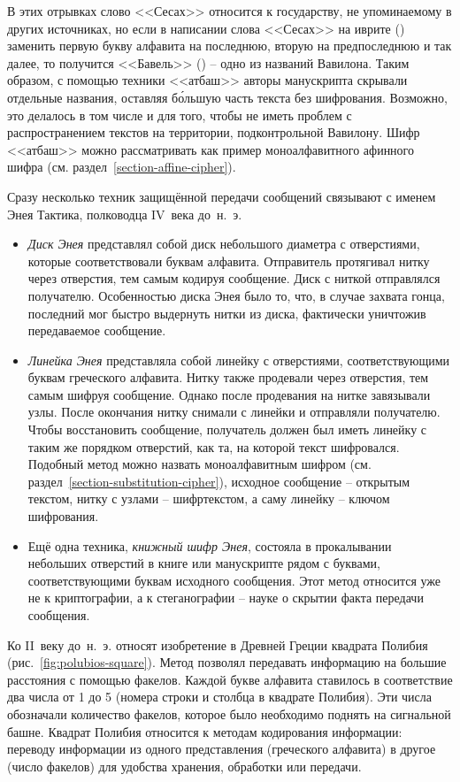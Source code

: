 В этих отрывках слово <<Сесах>> относится к государству, не упоминаемому в других источниках, но если в написании слова <<Сесах>> на иврите () заменить первую букву алфавита на последнюю, вторую на предпоследнюю и так далее, то получится <<Бавель>> () -- одно из названий Вавилона. Таким образом, с помощью техники <<атбаш>> авторы манускрипта скрывали отдельные названия, оставляя б\'{о}льшую часть текста без шифрования. Возможно, это делалось в том числе и для того, чтобы не иметь проблем с распространением текстов на территории, подконтрольной Вавилону. Шифр <<атбаш>> можно рассматривать как пример моноалфавитного афинного шифра (см. раздел~\ref{section-affine-cipher}).

Сразу несколько техник защищённой передачи сообщений связывают с именем Энея Тактика, полководца IV~века до~н.~э.
\begin{itemize}
	\item \emph{Диск Энея} представлял собой диск небольшого диаметра с отверстиями, которые соответствовали буквам алфавита. Отправитель протягивал нитку через отверстия, тем самым кодируя сообщение. Диск с ниткой отправлялся получателю. Особенностью диска Энея было то, что, в случае захвата гонца, последний мог быстро выдернуть нитки из диска, фактически уничтожив передаваемое сообщение.
	\item \emph{Линейка Энея} представляла собой линейку с отверстиями, соответствующими буквам греческого алфавита. Нитку также продевали через отверстия, тем самым шифруя сообщение. Однако после продевания на нитке завязывали узлы. После окончания нитку снимали с линейки и отправляли получателю. Чтобы восстановить сообщение, получатель должен был иметь линейку с таким же порядком отверстий, как та, на которой текст шифровался. Подобный метод можно назвать моноалфавитным шифром (см. раздел~\ref{section-substitution-cipher}), исходное сообщение -- открытым текстом, нитку с узлами -- шифртекстом, а саму линейку -- ключом шифрования.
	\item Ещё одна техника, \emph{книжный шифр Энея}, состояла в прокалывании небольших отверстий в книге или манускрипте рядом с буквами, соответствующими буквам исходного сообщения. Этот метод относится уже не к криптографии, а к стеганографии -- науке о скрытии факта передачи сообщения.
\end{itemize}

Ко II~веку до~н.~э. относят изобретение в Древней Греции квадрата Полибия (рис.~\ref{fig:polubios-square}). Метод позволял передавать информацию на большие расстояния с помощью факелов. Каждой букве алфавита ставилось в соответствие два числа от 1 до 5 (номера строки и столбца в квадрате Полибия). Эти числа обозначали количество факелов, которое было необходимо поднять на сигнальной башне. Квадрат Полибия относится к методам кодирования информации: переводу информации из одного представления (греческого алфавита) в другое (число факелов) для удобства хранения, обработки или передачи.

